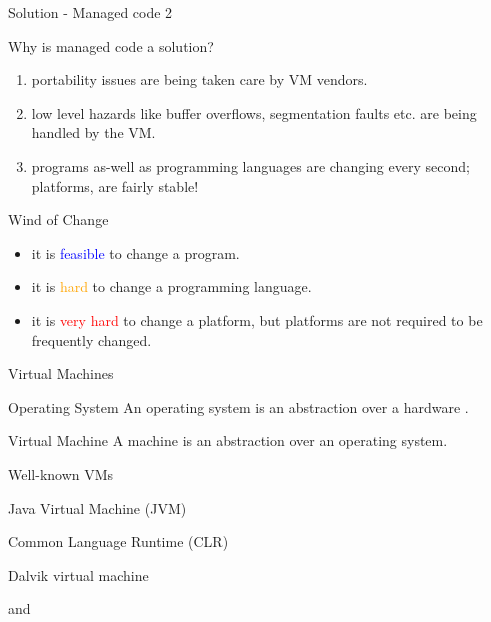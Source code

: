 
\begin{frame}{Solution - Managed code 2}
\begin{block}{Why is managed code a solution?}
\begin{enumerate}
  \pause
  \item portability issues are being taken care by VM vendors.
  \pause
  \item low level hazards like buffer overflows, segmentation faults etc. are
  being handled by the VM.
  \pause
  \item programs as-well as programming languages are changing every second;
  platforms, are fairly stable!
\end{enumerate}
\end{block}
\pause
\begin{block}{Wind of Change}
\begin{itemize}
  \item it is \textcolor{blue}{feasible} to change a program.
  \item it is \textcolor{orange}{hard} to change a programming language.
  \item it is \textcolor{red}{very hard} to change a platform, but platforms are
  not required to be frequently changed.
\end{itemize}
\end{block}
\end{frame}

\begin{frame}{Virtual Machines}
\begin{block}{Operating System}
An operating system is an abstraction over a hardware .
\end{block}
\pause
\begin{block}{Virtual Machine}
A  machine is an abstraction over an operating system.
\end{block}
\pause
\begin{exampleblock}{Well-known VMs}
\begin{description}
  \item[Java] Java Virtual Machine (JVM)
  \item[.Net] Common Language Runtime (CLR)
  \item[Android] Dalvik virtual machine
  \item
  and
\end{description}
\end{exampleblock}
\end{frame}

